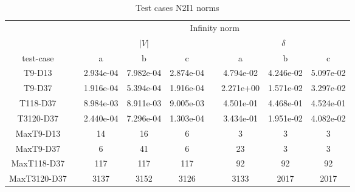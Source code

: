 \begin{table}
\renewcommand{\arraystretch}{1.3}
\centering
\label{}\hspace{2cm}\caption{Test cases N2I1 norms}
\begin{adjustbox}{width=1\textwidth} %
\small
\begin{tabular}{ccccccccc}
\toprule
{} && \multicolumn{7}{c}{Infinity norm}   \\
\cmidrule{3-9}
{} && \multicolumn{3}{c}{$|V|$} && \multicolumn{3}{c}{$\delta$}  \\
\cmidrule{3-5}\cmidrule{7-9}
 test-case &&        a &        b &       c &&        a &       b &        c \\
\midrule
T9-D13       &&  2.934e-04 &  7.982e-04 &  2.874e-04 &&  4.794e-02 &  4.246e-02 &  5.097e-02 \\
T9-D37       &&  1.916e-04 &  5.394e-04 &  1.916e-04 &&  2.271e+00 &  1.571e-02 &  3.297e-02 \\
T118-D37     &&  8.984e-03 &  8.911e-03 &  9.005e-03 &&  4.501e-01 &  4.468e-01 &  4.524e-01 \\
T3120-D37    &&  2.440e-04 &  7.296e-04 &  1.303e-04 &&  3.434e-01 &  1.951e-02 &  4.082e-02 \\
MaxT9-D13    &&         14 &         16 &          6 &&          3 &          3 &          3 \\
MaxT9-D37    &&          6 &         41 &          6 &&         23 &          3 &          3 \\
MaxT118-D37  &&        117 &        117 &        117 &&         92 &         92 &         92 \\
MaxT3120-D37 &&       3137 &       3152 &       3126 &&       3133 &       2017 &       2017 \\
\bottomrule
\end{tabular}
\end{adjustbox}
\end{table}

